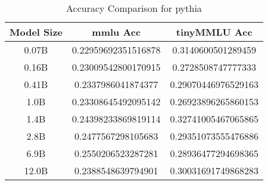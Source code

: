 \begin{table}[h!]
\centering
\begin{tabular}{|c|c|c|}
\hline
Model Size & mmlu Acc & tinyMMLU Acc \\ 
\hline
0.07B & 0.22959692351516878 & 0.3140600501289459 \\ 
\hline
0.16B & 0.23009542800170915 & 0.2728508747777333 \\ 
\hline
0.41B & 0.2337986041874377 & 0.29070446976529163 \\ 
\hline
1.0B & 0.23308645492095142 & 0.26923896265860153 \\ 
\hline
1.4B & 0.24398233869819114 & 0.32741005467065865 \\ 
\hline
2.8B & 0.2477567298105683 & 0.29351073555476886 \\ 
\hline
6.9B & 0.2550206523287281 & 0.28936477294698365 \\ 
\hline
12.0B & 0.2388548639794901 & 0.30031691749868283 \\ 
\hline
\end{tabular}
\caption{Accuracy Comparison for pythia}
\end{table}

